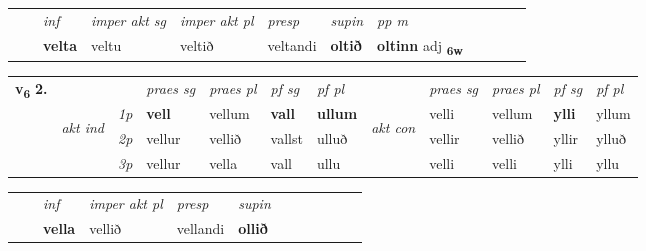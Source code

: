 \begin{tabular}{llllllllllll}
 & & \textit{inf} & \textit{imper akt sg} & \textit{imper akt pl}   & \textit{presp} & \textit{supin}  & \textit{pp m}     \\*
  & & \textbf{velta} & veltu  & veltið   & veltandi &  \textbf{oltið}  & \textbf{oltinn} adj \textbf{\textsubscript{6w}} \\*
\cmidrule{1-12}
\end{tabular}



\begin{tabular}{llllllllllll} \toprule
\multirow{4}{*}{{{\textbf{v{\textsubscript{6}}} \Large{\textbf{2.}}}}}  & &   &  \textit{praes sg}  & \textit{praes pl}  &\textit{ pf sg} & \textit{pf pl} &  &  \textit{praes sg}  & \textit{praes pl}  & \textit{pf sg} & \textit{pf pl } \\*
	\cmidrule{4-7} \cmidrule{9-12}
 & \multirow{3}{*}{\begin{turn}{90}\textit{akt ind}\end{turn}} & {\textit{1p}} & \textbf{vell} & vellum    & \textbf{vall} & \textbf{ullum} & \multirow{3}{*}{\begin{turn}{90}\textit{akt con}\end{turn}} &velli & vellum & \textbf{ylli} & yllum\\*
& &  {\textit{2p}} &  vellur  & vellið   & vallst & ulluð & & vellir & vellið & yllir & ylluð \\*
& &  {\textit{3p}} & vellur & vella   & vall & ullu & & velli & velli& ylli & yllu  \\*
\cmidrule{4-7} \cmidrule{9-12}
\end{tabular}


\begin{tabular}{llllllllllll}
 & & \textit{inf}  & \textit{imper akt pl}   & \textit{presp} & \textit{supin}       \\*
  & & \textbf{vella}   & vellið   & vellandi &  \textbf{ollið}   \\*
\cmidrule{1-12}
\end{tabular}



